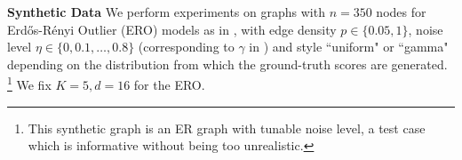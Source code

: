 \documentclass[nohyperref]{article}
\theoremstyle{plain}
\theoremstyle{definition}
\theoremstyle{remark}
\begin{document}
\begin{table}[tb!]
\centering
\vspace{-10pt}
\caption{Summary statistics 
for the real-world networks.
} 
\label{tab:data sets}
\vspace{-3mm}
\end{table} 



\textbf{Synthetic Data}
We perform experiments on graphs with $n=350$ nodes for Erd\H{o}s-R\'enyi Outlier (ERO) models 
as in \cite{d2021ranking}, with edge density $p\in\{0.05, 1\}$, noise level  $\eta\in\{0,0.1,\dots,0.8\}$ (corresponding to $\gamma$ in \cite{d2021ranking}) and style ``uniform" or ``gamma" depending on the distribution from which the ground-truth scores are generated. \footnote{This synthetic graph is
an ER graph with tunable noise level, a test case which is  informative without being  too unrealistic.} We fix $K=5, d=16$ for the ERO.
\end{document}
